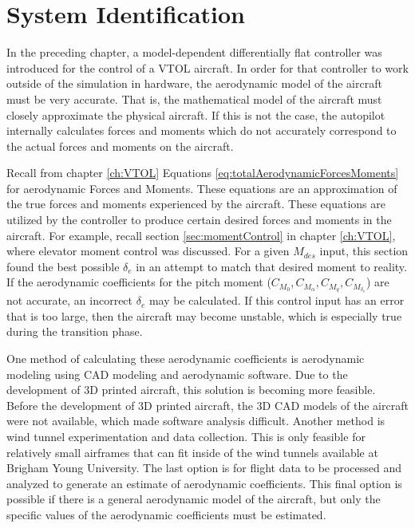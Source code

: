 \chapter{System Identification}
\label{ch:ch2}

In the preceding chapter, a model-dependent differentially flat controller was introduced for the control of a VTOL aircraft. 
In order for that controller to work outside of the simulation in hardware, the aerodynamic model of the aircraft must be very accurate. 
That is, the mathematical model of the aircraft must closely approximate the physical aircraft. 
If this is not the case, the autopilot internally calculates forces and moments which do not accurately correspond to the actual forces and moments on the aircraft. 

Recall from chapter \ref{ch:VTOL} Equations \ref{eq:totalAerodynamicForcesMoments} for aerodynamic Forces and Moments. 
These equations are an approximation of the true forces and moments experienced by the aircraft. 
These equations are utilized by the controller to produce certain desired forces and moments in the aircraft. 
For example, recall section \ref{sec:momentControl} in chapter \ref{ch:VTOL}, where elevator moment control was discussed. 
For a given $M_{des}$ input, this section found the best possible $\delta_e$ in an attempt to match that desired moment to reality. 
If the aerodynamic coefficients for the pitch moment ($C_{M_0},C_{M_\alpha},C_{M_q},C_{M_{\delta_e}}$) are not accurate, an incorrect $\delta_e$ may be calculated. 
If this control input has an error that is too large, then the aircraft may become unstable, which is especially true during the transition phase.

One method of calculating these aerodynamic coefficients is aerodynamic modeling using CAD modeling and aerodynamic software. 
Due to the development of 3D printed aircraft, this solution is becoming more feasible.
Before the development of 3D printed aircraft, the 3D CAD models of the aircraft were not available, which made software analysis difficult.
Another method is wind tunnel experimentation and data collection. 
This is only feasible for relatively small airframes that can fit inside of the wind tunnels available at Brigham Young University.
The last option is for flight data to be processed and analyzed to generate an estimate of aerodynamic coefficients.
This final option is possible if there is a general aerodynamic model of the aircraft, but only the specific values of the aerodynamic coefficients must be estimated.

